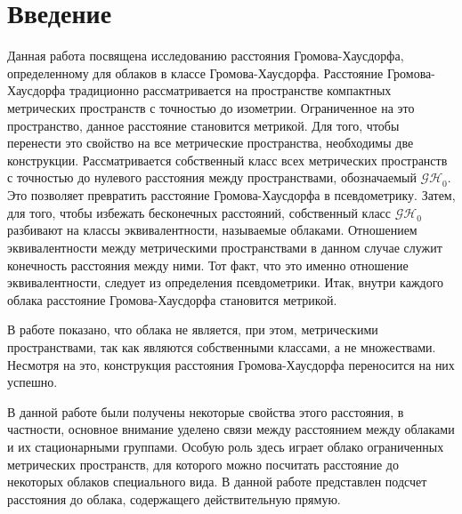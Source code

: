 \section*{Введение}  
 	Данная работа посвящена исследованию расстояния Громова-Хаусдорфа, 
определенному для облаков в классе Громова-Хаусдорфа. Расстояние Громова-Хаусдорфа традиционно рассматривается на пространстве компактных метрических пространств с точностью до изометрии. Ограниченное на это пространство, данное расстояние становится метрикой. Для того, чтобы перенести это свойство на все метрические пространства, необходимы две конструкции. 
Рассматривается собственный класс всех метрических пространств с точностью до нулевого
расстояния между пространствами, обозначаемый $\mathcal{GH}_0$. Это позволяет превратить расстояние Громова-Хаусдорфа в псевдометрику. Затем, для того, чтобы избежать бесконечных расстояний, собственный класс $\mathcal{GH}_0$ разбивают на классы эквивалентности, называемые облаками. Отношением эквивалентности между метрическими пространствами в данном случае служит конечность расстояния между ними. Тот факт, что это именно отношение эквивалентности, следует из определения псевдометрики. 
Итак, внутри каждого облака расстояние Громова-Хаусдорфа становится метрикой. 

	В работе показано, что облака не является, при этом, метрическими пространствами, так как
являются собственными классами, а не множествами. Несмотря на это, конструкция расстояния 
Громова-Хаусдорфа переносится на них успешно. 
 	
	В данной работе были получены некоторые свойства этого расстояния, 
в частности, основное внимание уделено связи между расстоянием между 
облаками и их стационарными группами. Особую роль здесь играет облако
ограниченных метрических пространств, для которого можно посчитать расстояние
до некоторых облаков специального вида. В данной работе представлен 
подсчет расстояния до облака, содержащего действительную прямую.

